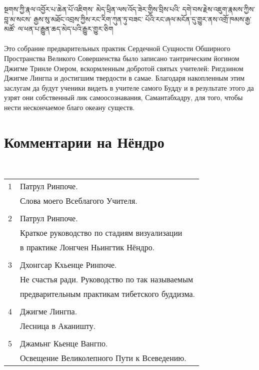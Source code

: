 སྔགས་ཀྱི་རྣལ་འབྱོར་པ་ཆེན་པོ་འཇིགས་
མེད་ཕྲིན་ལས་འོད་ཟེར་གྱིས་བྲིས་པའི་
དགེ་བས་རྗེས་འཇུག་རྣམས་ཀྱིས་བླ་མ་སངས་
རྒྱས་སུ་མཐོང་འབྲས་ཀྱིས་རང་རིག་ཀུན་ཏུ་བཟང་
པོའི་རང་ཞལ་མངོན་དུ་གྱུར་ནས་འགྲོ་ཁམས་རྒྱ་མཚོ་
ལ་ཕན་པ་རྒྱུན་ཆད་མེད་པའི་རྒྱུར་གྱུར་ཅིག\\
\\
\ru\scriptsize\noindent
Это собрание предварительных практик Сердечной Сущности
Об\-ширного Пространства Великого Совершенства было записано
тантри\-ческим йогином Джигме Тринле Озером,
вскормленным добротой святых учителей: Ригдзином Джигме Лингпа
и достигшим твердости в самае. Благодаря накопленным
этим заслугам да будут ученики видеть в учителе самого Будду
и в результате этого да узрят они собственный лик
самоосознавания, Самантабхадру, для того, чтобы нести
нескончаемое благо океану существ.
\normalsize
\newpage
\section*{Комментарии на Нёндро}
\\
\begin{tabular}{ll}
1 & Патрул Ринпоче. \\
  & Слова моего Всеблагого Учителя.\\
  \\
2 & Патрул Ринпоче. \\
  & Краткое руководство по стадиям визуализации \\
  & в практике Лонгчен Ньингтик Нёндро.\\
    \\
3 & Дхонгсар Кхьенце Ринпоче. \\
  & Не счастья ради. Руководство по так называемым \\
  & предварительным практикам тибетского буддизма.\\
  \\
4 & Джигме Лингпа. \\
  & Лесница в Аканишту.\\
  \\
5 & Джамьнг Кьенце Вангпо. \\
  & Освещение Великолепного Пути к Всеведению.\\
\end{tabular}

